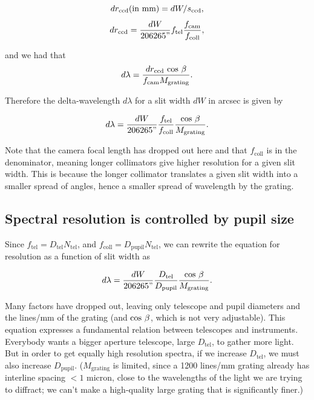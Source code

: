 \documentclass[12pt]{article}
\begin{document}
$$ dr_{\mathrm{ccd}} {\rm (in\ mm)} = dW / s_{\mathrm{ccd}} , $$
$$ dr_{\mathrm{ccd}} = \frac{dW}{206265"} f_{\mathrm{tel}} \frac{f_{\mathrm{cam}}}{f_{\mathrm{coll}}}, $$

and we had that
$$ d\lambda = \frac{dr_{\mathrm{ccd}}~{\rm cos}~\beta}{f_{\mathrm{cam}} M_{\mathrm{grating}}}. $$

Therefore the delta-wavelength $d\lambda$ for a slit width $dW$
in arcsec is given by

%

$$  d\lambda = \frac{dW}{206265"} \frac{f_{\mathrm{tel}}}{f_{\mathrm{coll}}}\frac{{\rm cos}~\beta}{M_{\mathrm{grating}}}. $$

Note that the camera focal length has dropped out here and
that $f_{\mathrm{coll}}$ is in the denominator, meaning longer collimators
give higher resolution for a given slit width.  This is 
because the longer collimator translates a given slit width
into a smaller spread of angles, hence a smaller spread of
wavelength by the grating.

\subsection{Spectral resolution is controlled by pupil size}

Since $f_{\mathrm{tel}} = D_{\mathrm{tel}} N_{\mathrm{tel}}$, and $f_{\mathrm{coll}} = D_{\mathrm{pupil}}  N_{\mathrm{tel}}$,
we can rewrite the equation for resolution as a function of 
slit width as

$$ d\lambda = \frac{dW}{206265"}  \frac{D_{\mathrm{tel}}}{D_{\mathrm{pupil}}} \frac{{\rm cos}~\beta}{M_{\mathrm{grating}}}. $$

Many factors have dropped out, leaving only telescope and
pupil diameters and the lines/mm of the grating (and ${\rm cos}~\beta$,
which is not very adjustable).
This equation expresses a fundamental relation between telescopes
and instruments.
Everybody wants a bigger aperture telescope, large $D_{\mathrm{tel}}$, to
gather more light.  But in order to get equally
high resolution spectra, if we increase $D_{\mathrm{tel}}$,
we must also increase $D_{\mathrm{pupil}}$.  ($M_{\mathrm{grating}}$ is limited, since a 
1200 lines/mm grating already has interline spacing $<1$ micron,
close to the wavelengths of the light we are trying to diffract;
we can't make a high-quality large grating that is significantly finer.)
\end{document}
